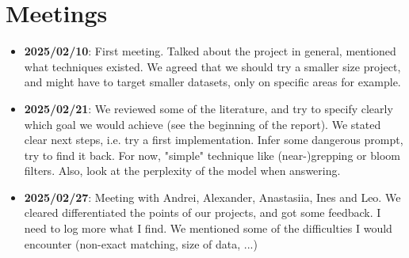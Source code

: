 \documentclass[a4paper,12pt]{article}
\begin{document}
\section*{Meetings}
\begin{itemize}
    \item \textbf{2025/02/10}: First meeting. Talked about the project in general, mentioned what techniques existed. We agreed that we should try a smaller size project, and might have to target smaller datasets, only on specific areas for example.  
    \item \textbf{2025/02/21}: We reviewed some of the literature, and try to specify clearly which goal we would achieve (see the beginning of the report). We stated clear next steps, i.e. try a first implementation. Infer some dangerous prompt, try to find it back. For now, "simple" technique like (near-)grepping or bloom filters. Also, look at the perplexity of the model when answering.  
    \item \textbf{2025/02/27}: Meeting with Andrei, Alexander, Anastasiia, Ines and Leo. We cleared differentiated the points of our projects, and got some feedback. I need to log more what I find. We mentioned some of the difficulties I would encounter (non-exact matching, size of data, ...)
    
\end{itemize}

\printbibliography
\end{document}
